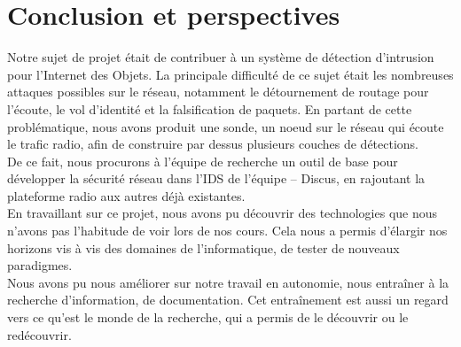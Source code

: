 \chapter*{Conclusion et perspectives}
\label{sec:conclusion}

    Notre sujet de projet était de contribuer à un système de détection d'intrusion pour l'Internet des Objets.
    La principale difficulté de ce sujet était les nombreuses attaques possibles sur le réseau, notamment le détournement de routage pour l'écoute, le vol d'identité et la falsification de paquets. En partant de cette problématique, nous avons produit une sonde, un noeud sur le réseau qui écoute le trafic radio, afin de construire par dessus plusieurs couches de détections.\\
    
    De ce fait, nous procurons à l'équipe de recherche un outil de base pour développer la sécurité réseau dans l'IDS de l'équipe -- Discus, en rajoutant la plateforme radio aux autres déjà existantes.\\

	En travaillant sur ce projet, nous avons pu découvrir des technologies que nous n'avons pas l'habitude de voir lors de nos cours. Cela nous a permis d'élargir nos horizons vis à vis des domaines de l'informatique, de tester de nouveaux paradigmes.\\
	Nous avons pu nous améliorer sur notre travail en autonomie, nous entraîner à la recherche d'information, de documentation. Cet entraînement est aussi un regard vers ce qu'est le monde de la recherche, qui a permis de le découvrir ou le redécouvrir.
	


